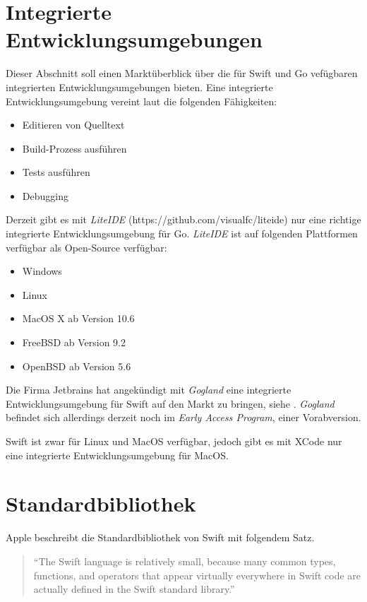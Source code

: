 \section{Integrierte Entwicklungsumgebungen}
\label{sec:IDE}
Dieser Abschnitt soll einen Marktüberblick über die für Swift und Go vefügbaren integrierten Entwicklungsumgebungen bieten.
Eine integrierte Entwicklungsumgebung vereint laut \cite[]{TechnoPedia} die folgenden Fähigkeiten:

\begin{itemize}
    \item Editieren von Quelltext
    \item Build-Prozess ausführen
    \item Tests ausführen
    \item Debugging
\end{itemize}

Derzeit gibt es mit \textit{LiteIDE} (https://github.com/visualfc/liteide) nur eine richtige integrierte Entwicklungsumgebung für Go.
\textit{LiteIDE} ist auf folgenden Plattformen verfügbar als Open-Source verfügbar:

\begin{itemize}
    \item Windows 
    \item Linux
    \item MacOS X ab Version 10.6
    \item FreeBSD ab Version 9.2
    \item OpenBSD ab Version 5.6
\end{itemize}

Die Firma Jetbrains hat angekündigt mit \textit{Gogland}\cite[]{Gogland} eine integrierte Entwicklungsumgebung für Swift auf den Markt zu bringen, siehe \cite[]{Gogland.Heise}.
\textit{Gogland} befindet sich allerdings derzeit noch im \textit{Early Access Program}, einer Vorabversion.

Swift ist zwar für Linux und MacOS verfügbar, jedoch gibt es mit XCode nur eine integrierte Entwicklungsumgebung für MacOS.

\section{Standardbibliothek}
Apple beschreibt die Standardbibliothek von Swift mit folgendem Satz.
\begin{quote}
\enquote{The Swift language is relatively small, because many common types, functions, and operators that appear virtually everywhere in Swift code are actually defined in the Swift standard library.} \cite[S.427]{Apple.2017}
\end{quote}

